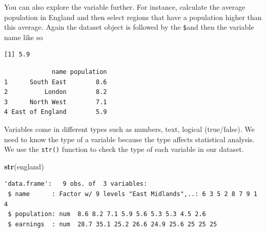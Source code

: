 \documentclass[]{article}
\newenvironment{Shaded}{\begin{snugshade}}{\end{snugshade}}
\newcommand{\KeywordTok}[1]{\textcolor[rgb]{0.13,0.29,0.53}{\textbf{#1}}}
\newcommand{\NormalTok}[1]{#1}
\newcommand{\OperatorTok}[1]{\textcolor[rgb]{0.81,0.36,0.00}{\textbf{#1}}}
\newcommand{\StringTok}[1]{\textcolor[rgb]{0.31,0.60,0.02}{#1}}
\begin{document}
You can also explore the variable further. For instance, calculate the average population in England and then select regions that have a population higher than this average. Again the dataset object is followed by the \texttt{\$}and then the variable name like so

\begin{Shaded}
\end{Shaded}

\begin{verbatim}
[1] 5.9
\end{verbatim}

\begin{Shaded}
\end{Shaded}

\begin{verbatim}
             name population
1      South East        8.6
2          London        8.2
3      North West        7.1
4 East of England        5.9
\end{verbatim}

Variables come in different types such as numbers, text, logical (true/false). We need to know the type of a variable because the type affects statistical analysis. We use the \texttt{str()} function to check the type of each variable in our dataset.

\begin{Shaded}
\begin{Highlighting}[]
\KeywordTok{str}\NormalTok{(england)}
\end{Highlighting}
\end{Shaded}

\begin{verbatim}
'data.frame':   9 obs. of  3 variables:
 $ name      : Factor w/ 9 levels "East Midlands",..: 6 3 5 2 8 7 9 1 4
 $ population: num  8.6 8.2 7.1 5.9 5.6 5.3 5.3 4.5 2.6
 $ earnings  : num  28.7 35.1 25.2 26.6 24.9 25.6 25 25 25
\end{verbatim}
\end{document}
